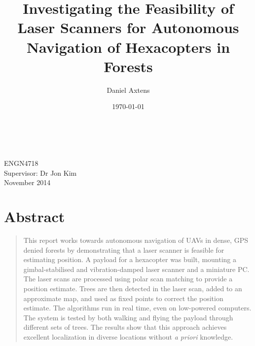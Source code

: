 \documentclass[12pt,oneside,a4paper]{book}
\title{Investigating the Feasibility of Laser Scanners for Autonomous
  Navigation of Hexacopters in Forests}
\author{Daniel Axtens}
\date{\today}
\begin{document}
\pagestyle{empty}
\thispagestyle{empty}

\begin{titlepage}
  \enlargethispage{2cm}
  \begin{center}
    \makeatletter
    \Huge\textbf{\@title} \\[2.9cm]
    \huge\textbf{\@author} \\[10.5cm]
    \makeatother
    \LARGE ENGN4718\\
    Supervisor: Dr Jon Kim\\[2cm]
    November 2014
  \end{center}
\end{titlepage}


%

%

%

\cleardoublepage
\pagestyle{headings}
%

\section*{\centering Abstract}
\label{sec:abstract}

\begin{quote}
  This report works towards autonomous navigation of \glspl{UAV} in
  dense, GPS denied forests by demonstrating that a laser scanner is
  feasible for estimating position. A payload for a hexacopter was
  built, mounting a gimbal-stabilised and vibration-damped laser
  scanner and a miniature PC. The laser scans are processed using
  polar scan matching to provide a position estimate. Trees are then
  detected in the laser scan, added to an approximate map, and used as
  fixed points to correct the position estimate. The algorithms run in
  real time, even on low-powered computers. The system is tested by
  both walking and flying the payload through different sets of
  trees. The results show that this approach achieves excellent
  localization in diverse locations without \emph{a priori} knowledge.
\end{quote}
\end{document}

